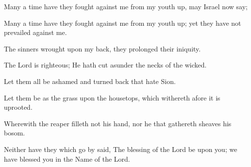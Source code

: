 Many a time have they fought against me from my youth up, may Israel now say;

Many a time have they fought against me from my youth up; yet they have not prevailed against me.

The sinners wrought upon my back, they prolonged their iniquity.

The Lord is righteous; He hath cut asunder the necks of the wicked.

Let them all be ashamed and turned back that hate Sion.

Let them be as the grass upon the housetops, which withereth afore it is uprooted.

Wherewith the reaper filleth not his hand, nor he that gathereth sheaves his bosom.

Neither have they which go by said, The blessing of the Lord be upon you; we have blessed you in the Name of the Lord.
